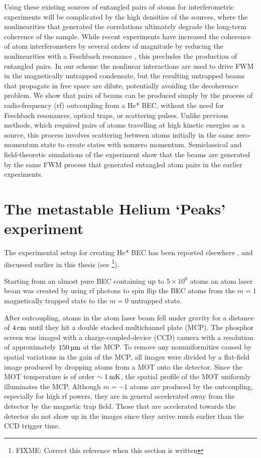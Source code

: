 Using these existing sources of entangled pairs of atoms for interferometric experiments will be complicated by the high densities of the sources, where the nonlinearities that generated the correlations ultimately degrade the long-term coherence of the sample. While recent experiments have increased the coherence of atom interferometers by several orders of magnitude by reducing the nonlinearities with a Feschbach resonance \citep{Fattori:2008,Gustavsson:2008}, this precludes the production of entangled pairs. In our scheme the nonlinear interactions are used to drive FWM in the magnetically untrapped condensate, but the resulting untrapped beams that propagate in free space are dilute, potentially avoiding the decoherence problem. We show that pairs of beams can be produced simply by the process of radio-frequency (rf) outcoupling from a He* BEC, without the need for Feschbach resonances, optical traps, or scattering pulses. Unlike previous methods, which required pairs of atoms travelling at high kinetic energies as a source, this process involves scattering between atoms initially in the same zero-momentum state to create states with nonzero momentum. Semiclassical and field-theoretic simulations of the experiment show that the beams are generated by the same FWM process that generated entangled atom pairs in the earlier experiments.

\section{The metastable Helium `Peaks' experiment}
\label{Peaks:ExperimentalSetup}

The experimental setup for creating He* BEC has been reported elsewhere \citep{Dall:2007a}, and discussed earlier in this thesis (see \footnote{FIXME: Correct this reference when this section is written}).

Starting from an almost pure BEC containing up to $5\times 10^6$ atoms an atom laser beam was created by using rf photons to spin flip the BEC atoms from the $m=1$ magnetically trapped state to the $m=0$ untrapped state.

After outcoupling, atoms in the atom laser beam fell under gravity for a distance of $\unit[4]{cm}$ until they hit a double stacked multichannel plate (MCP). The phosphor screen was imaged with a charge-coupled-device (CCD) camera with a resolution of approximately $\unit[150]{\micro m}$ at the MCP. To remove any nonuniformities caused by spatial variations in the gain of the MCP, all images were divided by a flat-field image produced by dropping atoms from a MOT onto the detector. Since the MOT temperature is of order $\sim\unit[1]{mK}$, the spatial profile of the MOT uniformly illuminates the MCP. Although $m=-1$ atoms are produced by the outcoupling, especially for high rf powers, they are in general accelerated away from the detector by the magnetic trap field. Those that are accelerated towards the detector do not show up in the images since they arrive much earlier than the CCD trigger time.

